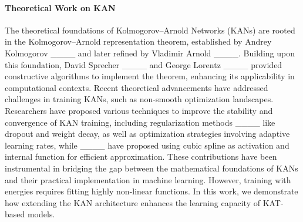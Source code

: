 \paragraph{Theoretical Work on KAN}
The theoretical foundations of Kolmogorov–Arnold Networks (KANs) are rooted in the Kolmogorov–Arnold representation theorem, established by Andrey Kolmogorov  ____ and later refined by Vladimir Arnold ____. 
Building upon this foundation, David Sprecher ____ and George Lorentz ____ provided constructive algorithms to implement the theorem, enhancing its applicability in computational contexts. 
Recent theoretical advancements have addressed challenges in training KANs, such as non-smooth optimization landscapes. Researchers have proposed various techniques to improve the stability and convergence of KAN training, including regularization methods ____ like dropout and weight decay, as well as optimization strategies involving adaptive learning rates, while ____ have proposed using cubic spline as activation and internal function for efficient approximation.  
These contributions have been instrumental in bridging the gap between the mathematical foundations of KANs and their practical implementation in machine learning.
However, training with energies requires fitting highly non-linear functions. In this work, we demonstrate how extending the KAN architecture enhances the learning capacity of KAT-based models.